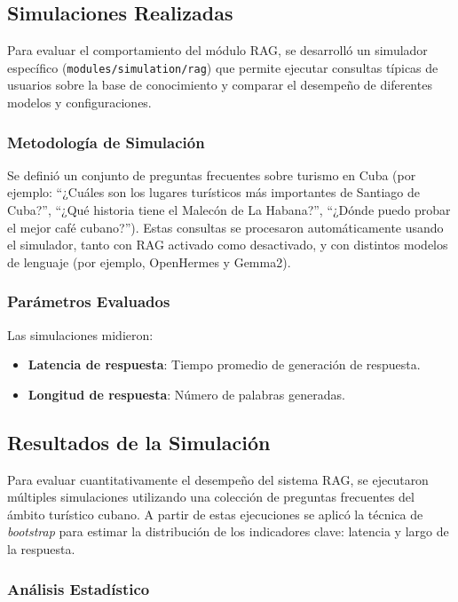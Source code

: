 \documentclass[runningheads]{llncs}
\begin{document}
\subsection{Simulaciones Realizadas}

Para evaluar el comportamiento del módulo RAG, se desarrolló un simulador específico (\texttt{modules/simulation/rag}) que permite ejecutar consultas típicas de usuarios sobre la base de conocimiento y comparar el desempeño de diferentes modelos y configuraciones.

\subsubsection{Metodología de Simulación}

Se definió un conjunto de preguntas frecuentes sobre turismo en Cuba (por ejemplo: ``¿Cuáles son los lugares turísticos más importantes de Santiago de Cuba?'', ``¿Qué historia tiene el Malecón de La Habana?'', ``¿Dónde puedo probar el mejor café cubano?''). Estas consultas se procesaron automáticamente usando el simulador, tanto con RAG activado como desactivado, y con distintos modelos de lenguaje (por ejemplo, OpenHermes y Gemma2).

\subsubsection{Parámetros Evaluados}

Las simulaciones midieron:
\begin{itemize}
    \item \textbf{Latencia de respuesta}: Tiempo promedio de generación de respuesta.
    \item \textbf{Longitud de respuesta}: Número de palabras generadas.

\end{itemize}

\subsection{Resultados de la Simulación}

Para evaluar cuantitativamente el desempeño del sistema RAG, se ejecutaron múltiples simulaciones utilizando una colección de preguntas frecuentes del ámbito turístico cubano. A partir de estas ejecuciones se aplicó la técnica de \textit{bootstrap} para estimar la distribución de los indicadores clave: latencia y largo de la respuesta.

\subsubsection{Análisis Estadístico}
\end{document}
